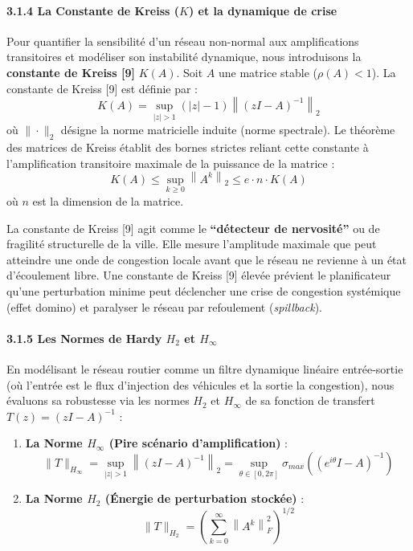 \documentclass[10pt, a4paper]{article}
\providecommand{\tightlist}{}
\begin{document}
\paragraph{\texorpdfstring{3.1.4 La Constante de Kreiss (\(K\)) et la
dynamique de
crise}{3.1.4 La Constante de Kreiss (K) et la dynamique de crise}}\label{la-constante-de-kreiss-k-et-la-dynamique-de-crise}

Pour quantifier la sensibilité d'un réseau non-normal aux amplifications
transitoires et modéliser son instabilité dynamique, nous introduisons
la \textbf{constante de Kreiss {[}9{]}} \(K(A)\). Soit \(A\) une matrice
stable (\(\rho(A) < 1\)). La constante de Kreiss {[}9{]} est définie par
: \[K(A) = \sup_{|z| > 1} (|z| - 1) \left\| (zI - A)^{-1} \right\|_2\]
où \(\|\cdot\|_2\) désigne la norme matricielle induite (norme
spectrale). Le théorème des matrices de Kreiss établit des bornes
strictes reliant cette constante à l'amplification transitoire maximale
de la puissance de la matrice :
\[K(A) \le \sup_{k \ge 0} \left\| A^k \right\|_2 \le e \cdot n \cdot K(A)\]
où \(n\) est la dimension de la matrice.

La constante de Kreiss {[}9{]} agit comme le \textbf{``détecteur de
nervosité''} ou de fragilité structurelle de la ville. Elle mesure
l'amplitude maximale que peut atteindre une onde de congestion locale
avant que le réseau ne revienne à un état d'écoulement libre. Une
constante de Kreiss {[}9{]} élevée prévient le planificateur qu'une
perturbation minime peut déclencher une crise de congestion systémique
(effet domino) et paralyser le réseau par refoulement
(\emph{spillback}).

\paragraph{\texorpdfstring{3.1.5 Les Normes de Hardy \(H_2\) et
\(H_\infty\)}{3.1.5 Les Normes de Hardy H\_2 et H\_\textbackslash infty}}\label{les-normes-de-hardy-h_2-et-h_infty}

En modélisant le réseau routier comme un filtre dynamique linéaire
entrée-sortie (où l'entrée est le flux d'injection des véhicules et la
sortie la congestion), nous évaluons sa robustesse via les normes
\(H_2\) et \(H_\infty\) de sa fonction de transfert
\(T(z) = (zI - A)^{-1}\) :

\begin{enumerate}
\def\labelenumi{\arabic{enumi}.}
\tightlist
\item
  \textbf{La Norme \(H_\infty\) (Pire scénario d'amplification)} :
  \[\|T\|_{H_\infty} = \sup_{|z| > 1} \left\| (zI - A)^{-1} \right\|_2 = \sup_{\theta \in [0, 2\pi]} \sigma_{max}\left( (e^{i\theta}I - A)^{-1} \right)\]
\item
  \textbf{La Norme \(H_2\) (Énergie de perturbation stockée)} :
  \[\|T\|_{H_2} = \left( \sum_{k=0}^{\infty} \left\| A^k \right\|_F^2 \right)^{1/2}\]
\end{enumerate}
\end{document}
